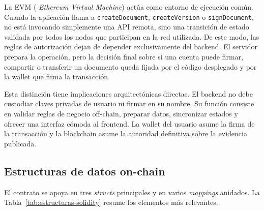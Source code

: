 \documentclass[11pt, a4paper]{article}
\begin{document}
La EVM (
\textit{Ethereum Virtual Machine}) actúa como entorno de ejecución común. Cuando la aplicación llama a \texttt{createDocument}, \texttt{createVersion} o \texttt{signDocument}, no está invocando simplemente una API remota, sino una transición de estado validada por todos los nodos que participan en la red utilizada. De este modo, las reglas de autorización dejan de depender exclusivamente del backend. El servidor prepara la operación, pero la decisión final sobre si una cuenta puede firmar, compartir o transferir un documento queda fijada por el código desplegado y por la wallet que firma la transacción.

Esta distinción tiene implicaciones arquitectónicas directas. El backend no debe custodiar claves privadas de usuario ni firmar en su nombre. Su función consiste en validar reglas de negocio off-chain, preparar datos, sincronizar estados y ofrecer una interfaz cómoda al frontend. La wallet del usuario asume la firma de la transacción y la blockchain asume la autoridad definitiva sobre la evidencia publicada.

\subsection{Estructuras de datos on-chain}

El contrato se apoya en tres \textit{structs} principales y en varios \textit{mappings} anidados. La Tabla~\ref{tab:estructuras-solidity} resume los elementos más relevantes.
\end{document}
